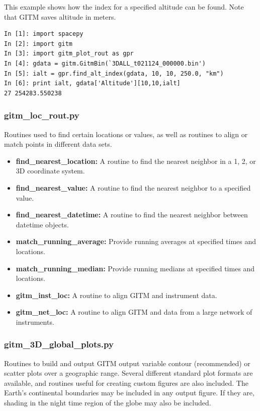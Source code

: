 This example shows how the index for a specified altitude can be found.  Note that GITM saves altitude in meters.

\begin{verbatim}
In [1]: import spacepy
In [2]: import gitm
In [3]: import gitm_plot_rout as gpr
In [4]: gdata = gitm.GitmBin(`3DALL_t021124_000000.bin')
In [5]: ialt = gpr.find_alt_index(gdata, 10, 10, 250.0, "km")
In [6]: print ialt, gdata['Altitude'][10,10,ialt]
27 254283.550238
\end{verbatim}

\subsubsection{gitm\_loc\_rout.py}

Routines used to find certain locations or values, as well as routines to align or match points in different data sets.

\begin{itemize}
\item[]{\bf find\_nearest\_location: } A routine to find the nearest neighbor in a 1, 2, or 3D coordinate system.
\item[]{\bf find\_nearest\_value: } A routine to find the nearest neighbor to a specified value.
\item[]{\bf find\_nearest\_datetime: } A routine to find the nearest neighbor between datetime objects.
\item[]{\bf match\_running\_average: } Provide running averages at specified times and locations.
\item[]{\bf match\_running\_median: } Provide running medians at specified times and locations.
\item[]{\bf gitm\_inst\_loc: } A routine to align GITM and instrument data.
\item[]{\bf gitm\_net\_loc: } A routine to align GITM and data from a large network of instruments.
\end{itemize} 

\subsubsection{gitm\_3D\_global\_plots.py}

Routines to build and output GITM output variable contour (recommended) or scatter plots over a geographic range.  Several different standard plot formats are available, and routines useful for creating custom figures are also included.  The Earth's continental boundaries may be included in any output figure.  If they are, shading in the night time region of the globe may also be included.

